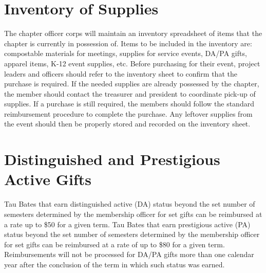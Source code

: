 \documentclass[bylaws,final,10pt,withoutoptional,withoutpreface,officerdoc]{../bylaws}
\begin{document}
\section{Inventory of Supplies} The chapter officer corps will maintain an inventory spreadsheet of items that the chapter is currently in possession of. Items to be included in the inventory are: compostable materials for meetings, supplies for service events, DA/PA gifts, apparel items, K-12 event supplies, etc. Before purchasing for their event, project leaders and officers should refer to the inventory sheet to confirm that the purchase is required. If the needed supplies are already possessed by the chapter, the member should contact the treasurer and president to coordinate pick-up of supplies. If a purchase is still required, the members should follow the standard reimbursement procedure to complete the purchase. Any leftover supplies from the event should then be properly stored and recorded on the inventory sheet.

\section{Distinguished and Prestigious Active Gifts} Tau Bates that earn distinguished active (DA) status beyond the set number of semesters determined by the membership officer for set gifts can be reimbursed at a rate up to \$50 for a given term. Tau Bates that earn prestigious active (PA) status beyond the set number of semesters determined by the membership officer for set gifts can be reimbursed at a rate of up to \$80 for a given term. Reimbursements will not be processed for DA/PA gifts more than one calendar year after the conclusion of the term in which such status was earned.   
\end{document}
